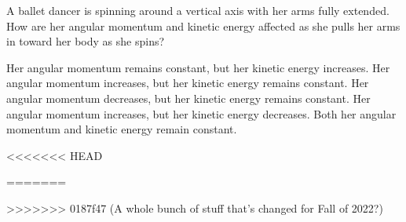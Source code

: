 \documentclass{../../oss-apphys-exam}
\begin{document}
\begin{multicols*}{2}
\begin{questions}
    \question A ballet dancer is spinning around a vertical axis with her arms
    fully extended. How are her angular momentum and kinetic energy affected
    as she pulls her arms in toward her body as she spins?
    \begin{choices}
      \choice Her angular momentum remains constant, but her kinetic energy
      increases.
      \choice Her angular momentum increases, but her kinetic energy remains
      constant.
      \choice Her angular momentum decreases, but her kinetic energy remains
      constant.
      \choice Her angular momentum increases, but her kinetic energy decreases.
      \choice Both her angular momentum and kinetic energy remain constant.
    \end{choices}
<<<<<<< HEAD

=======
    \vspace{.7in}
    
>>>>>>> 0187f47 (A whole bunch of stuff that's changed for Fall of 2022?)
    

\end{questions}
\end{multicols*}
\end{document}
